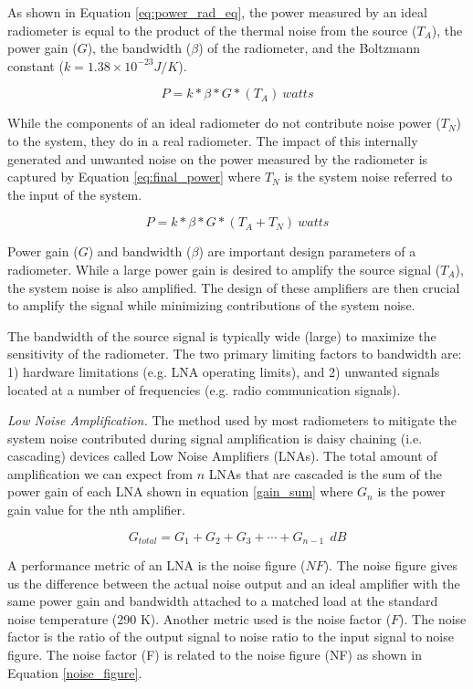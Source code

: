 As shown in Equation \ref{eq:power_rad_eq}, the power measured by an ideal radiometer is equal to the product of the thermal noise from the source ($T_A$), the power gain ($G$), the bandwidth ($\beta$) of the radiometer, and the Boltzmann constant ($k=1.38 \times 10^{-23} J/K$).

\begin{equation} \label{eq:power_rad_eq}
P=k*\beta*G*(T_{A})\ watts
\end{equation}

While the components of an ideal radiometer do not contribute noise power ($T_N$) to the system, they do in a real radiometer.  The impact of this internally generated and unwanted noise on the power measured by the radiometer is captured by Equation \ref{eq:final_power} where $T_N$ is the system noise referred to the input of the system.

\begin{equation} \label{eq:final_power}
P=k*\beta*G*(T_{A}+T_{N})\ watts
\end{equation}

Power gain ($G$) and bandwidth ($\beta$) are important design parameters of a radiometer.  While a large power gain is desired to amplify the source signal ($T_A$), the system noise is also amplified.  The design of these amplifiers are then crucial to amplify the signal while minimizing contributions of the system noise.

The bandwidth of the source signal is typically wide (large) to maximize the sensitivity of the radiometer.  The two primary limiting factors to bandwidth are: 1) hardware limitations (e.g. LNA operating limits), and 2) unwanted signals located at a number of frequencies (e.g. radio communication signals).

\emph{Low Noise Amplification.}  The method used by most radiometers to mitigate the system noise contributed during signal amplification is daisy chaining (i.e. cascading) devices called Low Noise Amplifiers (LNAs).  The total amount of amplification we can expect from $n$ LNAs that are cascaded is the sum of the power gain of each LNA shown in equation \ref{gain_sum} where $G_n$ is the power gain value for the nth amplifier.

\begin{equation}\label{gain_sum}
G_{total}=G_1 + G_2 + G_3 + \cdots +G_{n-1}\ \ dB
\end{equation}

A performance metric of an LNA is the noise figure ($NF$).  The noise figure gives us the difference between the actual noise output and an ideal amplifier with the same power gain and bandwidth attached to a matched load at the standard noise temperature (290 K).  Another metric used is the noise factor ($F$).  The noise factor is the ratio of the output signal to noise ratio to the input signal to noise figure.  The noise factor (F) is related to the noise figure (NF) as shown in Equation \ref{noise_figure}.

